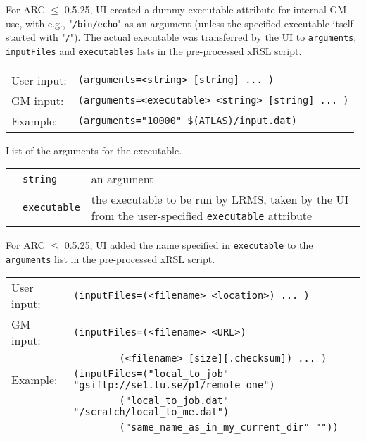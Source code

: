   For ARC $\leq$ 0.5.25, UI created a dummy executable attribute for internal GM use,
  with e.g., "\verb#/bin/echo#" as an argument (unless the
  specified executable itself started with "\verb#/#"). The actual
  executable was transferred by the UI to
  \texttt{arguments}, \texttt{inputFiles} and \texttt{executables} lists
  in the pre-processed xRSL script.

  \hspace*{0.5cm}
  \begin{shaded}
  \end{shaded}
  \begin{tabular}{lp{13cm}}
    User input:&\verb#(arguments=<string> [string] ... )#\\
    GM input:&\verb#(arguments=<executable> <string> [string] ... )#\\
    Example:&\verb#(arguments="10000" $(ATLAS)/input.dat)#\\ %
  \end{tabular}

  List of the arguments for the executable.

  \begin{tabular}{llp{10cm}}
    \hspace*{1cm}&\texttt{string}&an argument\\
    \hspace*{1cm}&\texttt{executable}&the executable to be run by LRMS, taken by the
    UI from the user-specified \texttt{executable} attribute\\
  \end{tabular}

  For ARC $\leq$ 0.5.25, UI added the name specified in \texttt{executable} to the 
  \texttt{arguments} list in the pre-processed xRSL script.

  \hspace*{0.5cm}
  \begin{shaded}
  \end{shaded}
  \begin{tabular}{lp{12cm}}
    User input:&\verb#(inputFiles=(<filename> <location>) ... )#\\
    GM input:&\verb#(inputFiles=(<filename> <URL>)#\\
    &\verb#        (<filename> [size][.checksum]) ... )#\\
    Example:&\verb#(inputFiles=("local_to_job" "gsiftp://se1.lu.se/p1/remote_one")#\\
    &\verb#        ("local_to_job.dat" "/scratch/local_to_me.dat")#\\
    &\verb#        ("same_name_as_in_my_current_dir" ""))#\\
  \end{tabular}

